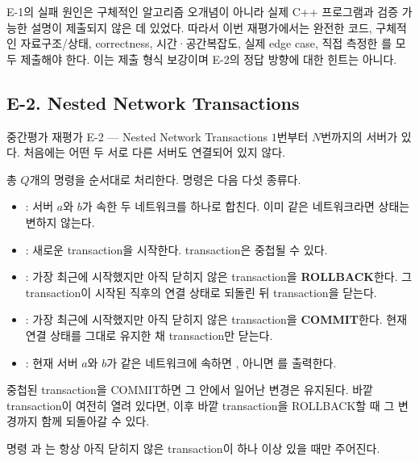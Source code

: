 \begin{notebox}
E-1의 실패 원인은 구체적인 알고리즘 오개념이 아니라 실제 C++ 프로그램과 검증 가능한 설명이 제출되지 않은 데 있었다. 따라서 이번 재평가에서는 완전한 코드, 구체적인 자료구조/상태, correctness, 시간·공간복잡도, 실제 edge case, 직접 측정한 를 모두 제출해야 한다. 이는 제출 형식 보강이며 E-2의 정답 방향에 대한 힌트는 아니다.
\end{notebox}

\subsection{E-2. Nested Network Transactions}
\begin{problembox}{중간평가 재평가 E-2 --- Nested Network Transactions}
$1$번부터 $N$번까지의 서버가 있다. 처음에는 어떤 두 서로 다른 서버도 연결되어 있지 않다.

총 $Q$개의 명령을 순서대로 처리한다. 명령은 다음 다섯 종류다.
\begin{itemize}
\item {}: 서버 $a$와 $b$가 속한 두 네트워크를 하나로 합친다. 이미 같은 네트워크라면 상태는 변하지 않는다.
\item {}: 새로운 transaction을 시작한다. transaction은 중첩될 수 있다.
\item {}: 가장 최근에 시작했지만 아직 닫히지 않은 transaction을 \textbf{ROLLBACK}한다. 그 transaction이 시작된 직후의 연결 상태로 되돌린 뒤 transaction을 닫는다.
\item {}: 가장 최근에 시작했지만 아직 닫히지 않은 transaction을 \textbf{COMMIT}한다. 현재 연결 상태를 그대로 유지한 채 transaction만 닫는다.
\item {}: 현재 서버 $a$와 $b$가 같은 네트워크에 속하면 , 아니면 를 출력한다.
\end{itemize}

중첩된 transaction을 COMMIT하면 그 안에서 일어난 변경은 유지된다. 바깥 transaction이 여전히 열려 있다면, 이후 바깥 transaction을 ROLLBACK할 때 그 변경까지 함께 되돌아갈 수 있다.

명령 과 는 항상 아직 닫히지 않은 transaction이 하나 이상 있을 때만 주어진다.


\end{problembox}
